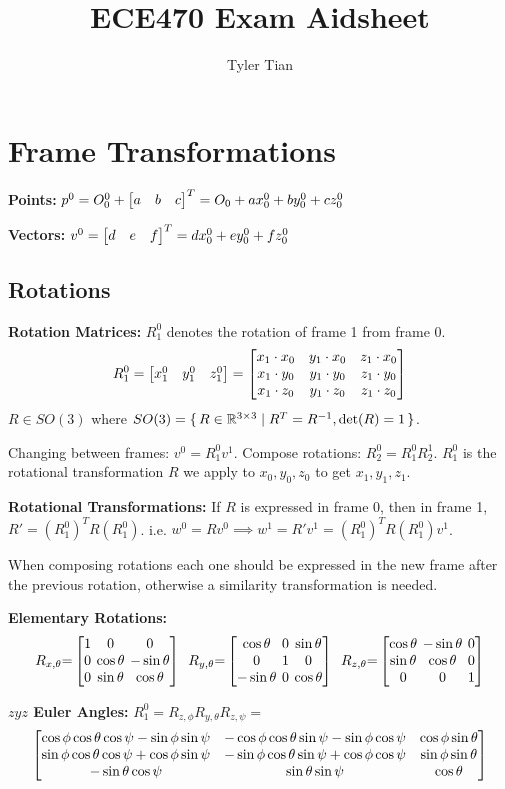 \documentclass[twocolumn, 8pt]{extarticle}
\title{ECE470 Exam Aidsheet}
\author{Tyler Tian}
\begin{document}
\section{Frame Transformations}

\textbf{Points:} \(p^0 = O_0^0 + \rvec{a}{b}{c}^T = O_0 + ax_0^0 + by_0^0 + cz_0^0\)

\textbf{Vectors:} \(v^0 = \rvec{d}{e}{f}^T = dx_0^0 + ey_0^0 + fz_0^0\)

\subsection{Rotations}

\textbf{Rotation Matrices:} \(R_1^0\) denotes the rotation of frame 1 from frame 0.
\[R_1^0 = \rvec{x_1^0}{y_1^0}{z_1^0} = \matthreeb{x_1 \cdot x_0}{y_1 \cdot x_0}{z_1 \cdot x_0}{x_1 \cdot y_0}{y_1 \cdot y_0}{z_1 \cdot y_0}{x_1 \cdot z_0}{y_1 \cdot z_0}{z_1 \cdot z_0}\]
\(R \in SO(3)\) where \(SO(3) = \set{R \in \mathbb{R}^{3 \times 3} | R^T = R^{-1}, \det(R) = 1}\).

Changing between frames: \(v^0 = R_1^0v^1\). Compose rotations: \(R_2^0 = R_1^0R_2^1\).
\(R_1^0\) is the rotational transformation \(R\) we apply to \(x_0, y_0, z_0\) to get \(x_1, y_1, z_1\).

\textbf{Rotational Transformations:} If \(R\) is expressed in frame 0, then in frame 1, \(R' = (R_1^0)^TR(R_1^0)\).
i.e. \(w^0 = Rv^0 \implies w^1 = R'v^1 = (R_1^0)^TR(R_1^0)v^1\).

When composing rotations each one should be expressed in the new frame after the previous rotation, otherwise a
similarity transformation is needed.

\textbf{Elementary Rotations:}
\[\begingroup
\setlength{\arraycolsep}{2pt}
R_{x, \theta} {=} \matthreeb{1}{0}{0}{0}{\cos\theta}{-\sin\theta}{0}{\sin\theta}{\cos\theta}
\enspace
R_{y, \theta} {=} \matthreeb{\cos\theta}{0}{\sin\theta}{0}{1}{0}{-\sin\theta}{0}{\cos\theta}
\enspace
R_{z, \theta} {=} \matthreeb{\cos\theta}{-\sin\theta}{0}{\sin\theta}{\cos\theta}{0}{0}{0}{1}
\endgroup\]

\textbf{\(zyz\) Euler Angles:} \(R_1^0 = R_{z,\phi}R_{y,\theta}R_{z,\psi} =\)
\[\begin{bmatrix} {\cos\phi\cos\theta\cos\psi - \sin\phi\sin\psi} & {-\cos\phi\cos\theta\sin\psi - \sin\phi\cos\psi} & {\cos\phi\sin\theta} \\ {\sin\phi\cos\theta\cos\psi + \cos\phi\sin\psi} & {-\sin\phi\cos\theta\sin\psi + \cos\phi\cos\psi} & {\sin\phi\sin\theta} \\ {-\sin\theta\cos\psi} & {\sin\theta\sin\psi} & {\cos\theta} \end{bmatrix}\]
\end{document}
